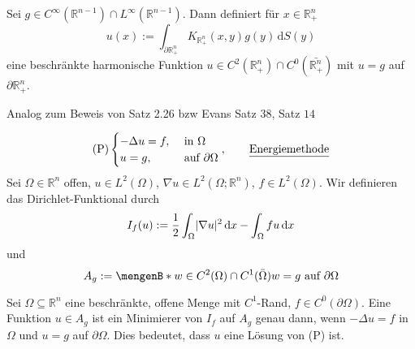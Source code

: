 \begin{satz}
	Sei $g \in C^{\infty}(\mathbb{R}^{n-1})\cap L^{\infty}(\mathbb{R}^{n-1})$. Dann definiert für $x \in \mathbb{R}^n_+$
	\[
		u(x):= \int_{\partial \mathbb{R}^n_+}^{} K_{\mathbb{R}^n_+}(x,y)g(y) \,\mathrm{d}S(y)
	\]
	eine beschränkte harmonische Funktion $u \in C^2(\mathbb{R}^n_+) \cap C^0(\bar{\mathbb{R}^n_+})$ mit $u =g$ auf $ \partial \mathbb{R}^n_+$.
\end{satz}
\begin{beweis}
	Analog zum Beweis von Satz 2.26 bzw Evans Satz $38$, Satz $14$
\end{beweis}

\[
	\text{(P)} \begin{cases}
		- \Delta u = f, &\text{ in }\Omega\\
		u = g , & \text{ auf } \partial \Omega
	\end{cases}, \qquad \text{\underline{Energiemethode}}
\]
Sei $\Omega \in \mathbb{R}^n$ offen, $u \in L^2(\Omega)$, $ \nabla u \in L^2(\Omega; \mathbb{R}^n)$, $f \in L^2(\Omega)$. Wir definieren das Dirichlet-Funktional durch
\[
	I_f(u):= \frac{1}{2} \int_{\Omega}^{} \lvert \nabla u\rvert^2 \,\mathrm{d}x - \int_{\Omega}^{} f u \,\mathrm{d}x
\]
und 
\[
	A_g := \set[ w \in C^2(\Omega) \cap C^1(\bar{\Omega})]{w=g \text{ auf } \partial \Omega}
\]
\begin{satz}
	Sei $\Omega \subseteq \mathbb{R}^n$ eine beschränkte, offene Menge mit $C^1$-Rand, $f \in C^0(\partial \Omega)$. 
	Eine Funktion $u \in A_g$ ist ein Minimierer von $I_f$ auf $A_g$ genau dann, wenn $ - \Delta u = f$ in $\Omega$ und $u =g$ auf $\partial \Omega$.
	Dies bedeutet, dass $u$ eine Lösung von (P) ist.
\end{satz}

